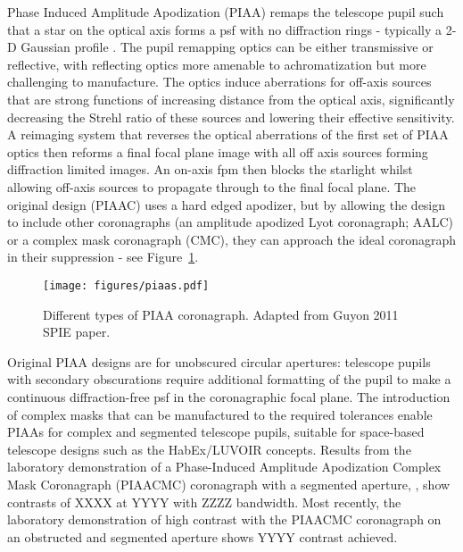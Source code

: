 \documentclass[letterpaper]{ar-1col}
\begin{document}
Phase Induced Amplitude Apodization (PIAA) remaps the telescope pupil such that a star on the optical axis forms a \ac{psf} with no diffraction rings - typically a 2-D Gaussian profile \citep{Guyon03,Guyon05,Guyon14}.
%
The pupil remapping optics can be either transmissive or reflective, with reflecting optics more amenable to achromatization but more challenging to manufacture.
%
The optics induce aberrations for off-axis sources that are strong functions of increasing distance from the optical axis, significantly decreasing the Strehl ratio of these sources and lowering their effective sensitivity.
%
A reimaging system that reverses the optical aberrations of the first set of PIAA optics then reforms a final focal plane image with all off axis sources forming diffraction limited images.
%
An on-axis \ac{fpm} then blocks the starlight whilst allowing off-axis sources to propagate through to the final focal plane.
%
The original design (PIAAC) uses a hard edged apodizer, but by allowing the design to include other coronagraphs (an amplitude apodized Lyot coronagraph; AALC) or a complex mask coronagraph (CMC), they can approach the ideal coronagraph in their suppression - see Figure~\ref{fig:piaatypes}.

\begin{figure}[ht]
  \centering
  \texttt{[image: figures/piaas.pdf]}
  \caption{Different types of PIAA coronagraph. Adapted from Guyon 2011 SPIE paper.}
  \label{fig:piaatypes}
\end{figure}

%
Original PIAA designs are for unobscured circular apertures: telescope pupils with secondary obscurations require additional formatting of the pupil to make a continuous diffraction-free \ac{psf} in the coronagraphic focal plane.
%
The introduction of complex masks that can be manufactured to the required tolerances enable PIAAs for complex and segmented telescope pupils, suitable for space-based telescope designs such as the HabEx/LUVOIR concepts.
%
Results from the laboratory demonstration of a Phase-Induced Amplitude Apodization Complex Mask Coronagraph (PIAACMC) coronagraph with a segmented aperture, \citep{Marx21}, show contrasts of XXXX at YYYY with ZZZZ bandwidth.
%
Most recently, the laboratory demonstration of high contrast with the PIAACMC coronagraph on an obstructed and segmented aperture \citep{Belikov22} shows YYYY contrast achieved.
\end{document}

